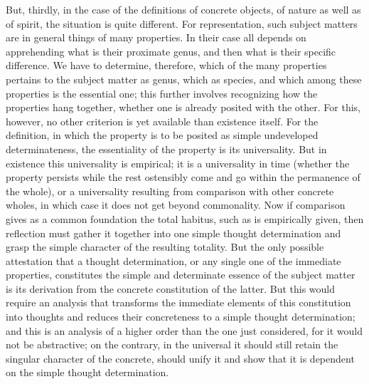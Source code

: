 But, thirdly, in the case of
the definitions of concrete objects,
of nature as well as of spirit,
the situation is quite different.
For representation, such subject matters are
in general things of many properties.
In their case all depends on apprehending
what is their proximate genus,
and then what is their specific difference.
We have to determine, therefore,
which of the many properties pertains
to the subject matter as genus, which as species,
and which among these properties is the essential one;
this further involves recognizing
how the properties hang together,
whether one is already posited with the other.
For this, however, no other criterion is
yet available than existence itself.
For the definition, in which the property is
to be posited as simple undeveloped determinateness,
the essentiality of the property is its universality.
But in existence this universality is empirical;
it is a universality in time
(whether the property persists while
the rest ostensibly come and go within
the permanence of the whole),
or a universality resulting from comparison
with other concrete wholes,
in which case it does not get beyond commonality.
Now if comparison gives as a common foundation
the total habitus, such as is empirically given,
then reflection must gather it together
into one simple thought determination
and grasp the simple character of the resulting totality.
But the only possible attestation that a thought determination,
or any single one of the immediate properties,
constitutes the simple and determinate
essence of the subject matter is
its derivation from the concrete constitution of the latter.
But this would require an analysis that transforms
the immediate elements of this constitution into thoughts
and reduces their concreteness to a simple thought determination;
and this is an analysis of a higher order than
the one just considered,
for it would not be abstractive;
on the contrary, in the universal it should still retain
the singular character of the concrete,
should unify it and show that it is dependent on
the simple thought determination.


